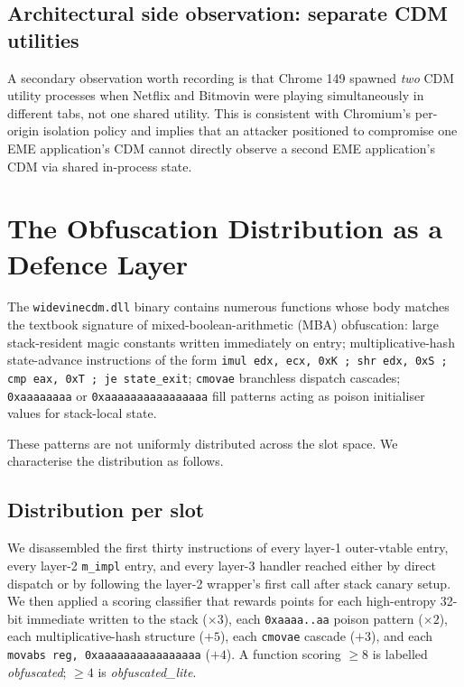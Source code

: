 \documentclass[11pt,letterpaper]{article}
\begin{document}
\subsection{Architectural side observation: separate CDM utilities}

A secondary observation worth recording is that Chrome 149 spawned
\emph{two} CDM utility processes when Netflix and Bitmovin were
playing simultaneously in different tabs, not one shared utility.
This is consistent with Chromium's per-origin isolation policy and
implies that an attacker positioned to compromise one EME
application's CDM cannot directly observe a second EME application's
CDM via shared in-process state.

\section{The Obfuscation Distribution as a Defence Layer}
\label{sec:obfuscation}

The \texttt{widevinecdm.dll} binary contains numerous functions whose
body matches the textbook signature of mixed-boolean-arithmetic
(MBA) obfuscation: large stack-resident magic constants written
immediately on entry; multiplicative-hash state-advance instructions
of the form
\texttt{imul edx, ecx, 0xK ; shr edx, 0xS ; cmp eax, 0xT ; je
state\_exit}; \texttt{cmovae} branchless dispatch cascades;
\texttt{0xaaaaaaaa} or
\texttt{0xaaaaaaaaaaaaaaaa} fill patterns acting as poison initialiser
values for stack-local state.

These patterns are not uniformly distributed across the slot space.
We characterise the distribution as follows.

\subsection{Distribution per slot}

We disassembled the first thirty instructions of every layer-1
outer-vtable entry, every layer-2 \texttt{m\_impl} entry, and every
layer-3 handler reached either by direct dispatch or by following the
layer-2 wrapper's first call after stack canary setup.  We then
applied a scoring classifier that rewards points for each
high-entropy 32-bit immediate written to the stack
($\times 3$), each \texttt{0xaaaa..aa} poison pattern
($\times 2$), each multiplicative-hash structure ($+5$), each
\texttt{cmovae} cascade ($+3$), and each
\texttt{movabs reg, 0xaaaaaaaaaaaaaaaa} ($+4$).  A function scoring
$\geq 8$ is labelled \emph{obfuscated}; $\geq 4$ is
\emph{obfuscated\_lite}.
\end{document}
